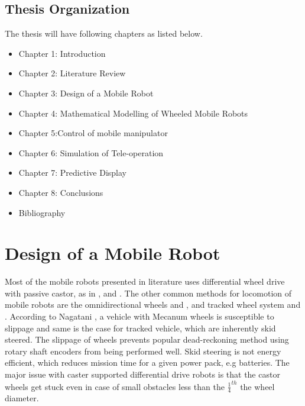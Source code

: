 \documentclass[12pt,a4paper, notitlepage]{article}
\begin{document}
\subsection{Thesis Organization}
The thesis will have following chapters as listed below.
\begin{itemize}
\item [ ] {Chapter 1: Introduction}
\item [ ] {Chapter 2: Literature Review}
\item []{Chapter 3: Design of a Mobile Robot}  
\item []{Chapter 4: Mathematical Modelling of Wheeled Mobile Robots }
\item []{Chapter 5:Control of mobile manipulator }   
\item []{Chapter 6: Simulation of Tele-operation }
\item []{Chapter 7: Predictive Display }
\item []{Chapter 8: Conclusions}
\item []{Bibliography}
\end{itemize}
	\section{Design of a Mobile Robot}
	\label{Design}
	Most of the mobile robots presented in literature uses differential wheel drive  with passive castor, as in \cite{yamamoto1992coordinating}, \cite{rajendran2004} and \cite{saha1989kinematics}. The other  common methods for locomotion of mobile robots are the omnidirectional wheels  \cite{pin1994new} and \cite{salih2006designing}, and tracked wheel system \cite{suthakorn2009design} and \cite{guarnieri2004development}. According  to  Nagatani \cite{nagatani2000improvement},  a  vehicle  with  Mecanum  wheels  is  susceptible  to slippage and same is the case for tracked vehicle, which are inherently skid steered. The slippage of  wheels prevents  popular dead-reckoning method using rotary shaft  encoders   from  being  performed  well.  Skid steering is not energy efficient, which reduces  mission time for a given power pack, e.g batteries. The major issue with caster supported differential drive robots is that  the castor wheels get stuck even in case of small obstacles less than the $\frac{1}{4}^{th}$ the wheel diameter. 
	
\end{document}
